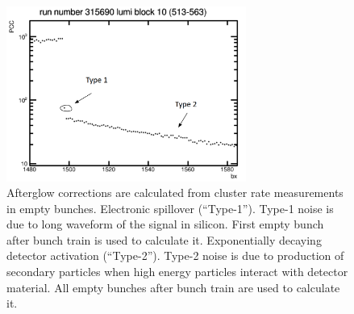 \begin{figure}[!htp]
\centering
\includegraphics[width=0.7\textwidth]{ashish_thesis/afterglow_type1_type2.png}
\caption{%
Afterglow corrections are calculated from cluster rate measurements in empty bunches. Electronic spillover (“Type-1”). Type-1 noise is due to long waveform of the signal in silicon. First empty bunch after bunch train is used to calculate it. Exponentially decaying detector activation (“Type-2”).  Type-2 noise is due to production of secondary particles when high energy particles interact with detector material. All empty bunches after bunch train are used to calculate it.
}
\label{fig:pcc_afterglow}
\end{figure}






